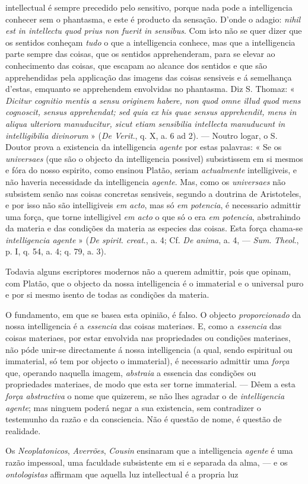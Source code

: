 intellectual é sempre precedido pelo sensitivo, porque nada pode a intelligencia conhecer sem o phantasma, e este é producto da sensação. D'onde o adagio: \emph{nihil est in intellectu quod prius non fuerit in sensibus}. Com isto não se quer dizer que os sentidos conheçam \emph{tudo} o que a intelligencia conhece, mas que a intelligencia parte sempre das coisas, que os sentidos apprehenderam, para se elevar ao conhecimento das coisas, que escapam ao alcance dos sentidos e que são apprehendidas pela applicação das imagens das coisas sensiveis e á semelhança d'estas, emquanto se apprehendem envolvidas no phantasma. Diz S. Thomaz: « \emph{Dicitur cognitio mentis a sensu originem habere, non quod omne illud quod mens cognoscit, sensus apprehendat; sed quia ex his quae sensus apprehendit, mens in aliqua ulteriora manuducitur, sicut etiam sensibilia intellecta manuducunt in intelligibilia divinorum} » (\emph{De Verit}., q. X, a. 6 ad 2). --- Noutro logar, o S. Doutor prova a existencia da intelligencia \emph{agente} por estas palavras: « Se os \emph{universaes} (que são o objecto da intelligencia possivel) subsistissem em si mesmos e fóra do nosso espirito, como ensinou Platão, seriam \emph{actualmente} intelligiveis, e não haveria necessidade da intelligencia \emph{agente}. Mas, como os \emph{universaes} não subsistem senão nas coisas concretas sensiveis, segundo a doutrina de Aristoteles, e por isso não são intelligiveis \emph{em acto}, mas só \emph{em potencia}, é necessario admittir uma força, que torne intelligivel \emph{em acto} o que só o era \emph{em potencia}, abstrahindo da materia e das condições da materia as especies das coisas. Esta força chama-se \emph{intelligencia agente} » (\emph{De spirit}. \emph{creat}., a. 4; Cf. \emph{De anima}, a. 4, --- \emph{Sum}. \emph{Theol}., p. I, q. 54, a. 4; q. 79, a. 3).\par Todavia alguns escriptores modernos não a querem admittir, pois que opinam, com Platão, que o objecto da nossa intelligencia é o immaterial e o universal puro e por si mesmo isento de todas as condições da materia.\par O fundamento, em que se basea esta opinião, é falso. O objecto \emph{proporcionado} da nossa intelligencia é a \emph{essencia} das coisas materiaes. E, como a \emph{essencia} das coisas materiaes, por estar envolvida nas propriedades ou condições materiaes, não póde unir-se directamente á nossa intelligencia (a qual, sendo espiritual ou immaterial, só tem por objecto o immaterial), é necessario admittir uma \emph{força} que, operando naquella imagem, \emph{abstraia} a essencia das condições ou propriedades materiaes, de modo que esta ser torne immaterial. --- Dêem a esta \emph{força abstractiva} o nome que quizerem, se não lhes agradar o de \emph{intelligencia agente}; mas ninguem poderá negar a sua existencia, sem contradizer o testemunho da razão e da consciencia. Não é questão de nome, é questão de realidade.\par Os \emph{Neoplatonicos}, \emph{Averrões}, \emph{Cousin} ensinaram que a intelligencia \emph{agente} é uma razão impessoal, uma faculdade subsistente em si e separada da alma, --- e os \emph{ontologistas} affirmam que aquella luz intellectual é a propria luz 
